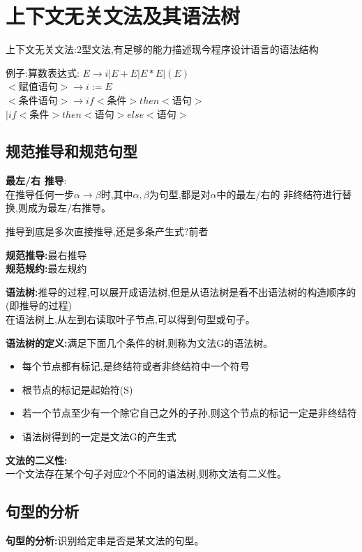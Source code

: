 \documentclass[UTF8,a4paper]{ctexart}
\begin{document}
  \section{上下文无关文法及其语法树}
  上下文无关文法:2型文法,有足够的能力描述现今程序设计语言的语法结构

  例子:算数表达式:
  $E\to i|E+E|E*E|(E)$\\
  $<\text{赋值语句}> \to i := E$\\
  $<\text{条件语句}> \to if <\text{条件}> then <\text{语句}>$\\
  $| if <\text{条件}> then <\text{语句}> else <\text{语句}>$

  \subsection{规范推导和规范句型}
  \textbf{最左/右 推导}:\\
  在推导任何一步$\alpha\to \beta$时,其中$\alpha,\beta$为句型,都是对$\alpha$中的最左/右的
  非终结符进行替换,则成为最左/右推导。

  {\color{blue}推导到底是多次直接推导,还是多条产生式?前者}

  \textbf{规范推导:}最右推导\\
  \textbf{规范规约:}最左规约

  \textbf{语法树:}推导的过程,可以展开成语法树,但是从语法树是看不出语法树的构造顺序的(即推导的过程)\\
  在语法树上,从左到右读取叶子节点,可以得到句型或句子。

  \textbf{语法树的定义:}满足下面几个条件的树,则称为文法G的语法树。
  \begin{itemize}
    \item 每个节点都有标记,是终结符或者非终结符中一个符号
    \item 根节点的标记是起始符(S)
    \item 若一个节点至少有一个除它自己之外的子孙,则这个节点的标记一定是非终结符
    \item 语法树得到的一定是文法G的产生式
  \end{itemize}

  \textbf{文法的二义性:}\\
  一个文法存在某个句子对应2个不同的语法树,则称文法有二义性。

  \subsection{句型的分析}
  \textbf{句型的分析:}识别给定串是否是某文法的句型。
\end{document}
